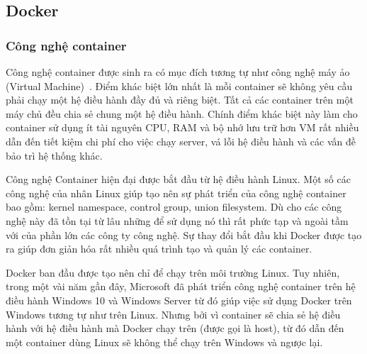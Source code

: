 \subsection{Docker}
\subsubsection{Công nghệ container}
Công nghệ container được sinh ra có mục đích tương tự như công
nghệ máy ảo (Virtual Machine)~\cite{dockerbook}.
Điểm khác biệt lớn nhất là mỗi container
sẽ không yêu cầu phải chạy một hệ điều hành đầy đủ và riêng biệt.
Tất cả các container trên một máy chủ đều chia sẻ chung một hệ
điều hành. Chính điểm khác biệt này làm cho container sử dụng ít tài
nguyên CPU, RAM và bộ nhớ lưu trữ hơn VM rất nhiều dẫn đến tiết
kiệm chi phí cho việc chạy server, vá lỗi hệ điều hành và các
vấn đề bảo trì hệ thống khác.

Công nghệ Container hiện đại được bắt đầu từ hệ điều hành Linux.
Một số các công nghệ của nhân Linux giúp tạo nên sự phát triển của
công nghệ container bao gồm: kernel namespace, control group, union
filesystem. Dù cho các công nghệ này đã tồn tại từ lâu những để
sử dụng nó thì rất phức tạp và ngoài tầm với của phần lớn các
công ty công nghệ. Sự thay đổi bắt đầu khi Docker được tạo ra
giúp đơn giản hóa rất nhiều quá trình tạo và quản lý các container. 

Docker ban đầu được tạo nên chỉ để chạy trên môi trường Linux.
Tuy nhiên, trong một vài năm gần đây, Microsoft đã phát triển
công nghệ container trên hệ điều hành Windows 10 và Windows Server từ
đó giúp việc sử dụng Docker trên Windows tương tự như trên Linux.
Nhưng bởi vì container sẽ chia sẻ hệ điều hành với hệ điều hành
mà Docker chạy trên (được gọi là host), từ đó dẫn đến một container
dùng Linux sẽ không thể chạy trên Windows và ngược lại.

